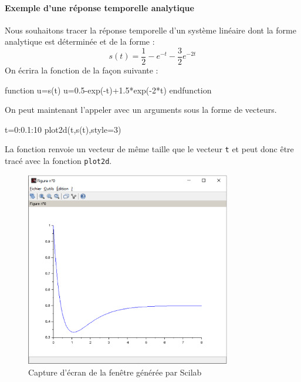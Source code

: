 \paragraph{Exemple d'une réponse temporelle analytique}
Nous souhaitons tracer la réponse temporelle d'un système linéaire dont la
forme analytique est déterminée et de la forme :
\[
s(t)=\dfrac{1}{2}-e^{-t}-\dfrac{3}{2}e^{-2t}
\]
On écrira la fonction de la façon suivante :
\begin{Scilabcode}
function u=s(t)
    u=0.5-exp(-t)+1.5*exp(-2*t)
endfunction
\end{Scilabcode}
On peut maintenant l'appeler avec un arguments sous la forme de vecteurs. 
\begin{Scilabcode}
t=0:0.1:10
plot2d(t,s(t),style=3)
\end{Scilabcode}
La fonction renvoie un vecteur de même taille que le vecteur \verb?t? et peut
donc être tracé avec la fonction \verb?plot2d?.
\begin{figure}[!hb]
    \centering
    \includegraphics[width=0.8\textwidth]{fig/capture_SCILAB-fonction.eps}
    \caption{Capture d'écran de la fenêtre générée par Scilab}
\end{figure}
\newpage
